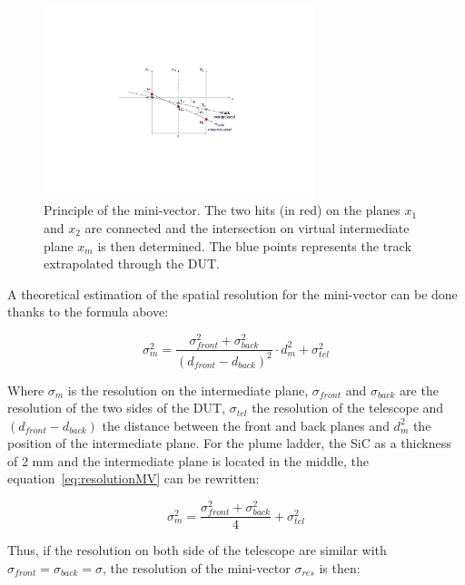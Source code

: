     \begin{figure}[!h]
      \centering
      \includegraphics[width=0.7\textwidth]{Pictures/deformation/mini_vectors.pdf}
      \caption{Principle of the mini-vector. The two hits (in red) on the planes $x_1$ and $x_2$ are connected and the intersection on virtual intermediate plane $x_m$ is then determined. The blue points represents the track extrapolated through the DUT. }
      \label{fig:MV}
    \end{figure}

    A theoretical estimation of the spatial resolution for the mini-vector can be done thanks to the formula above:

    \begin{equation}
      \sigma_m^2 = \frac{\sigma_{front}^2 + \sigma_{back}^2}{(d_{front} - d_{back})^2} \cdot d_{m}^2 + \sigma_{tel}^2
      \label{eq:resolutionMV}
    \end{equation}

    Where $\sigma_m$ is the resolution on the intermediate plane, $\sigma_{front}$ and $\sigma_{back}$ are the resolution of the two sides of the \gls{DUT}, $\sigma_{tel}$ the resolution of the telescope and $(d_{front} - d_{back})$ the distance between the front and back planes and $d_{m}^2$ the position of the intermediate plane.
    For the plume ladder, the \gls{SiC} as a thickness of 2 mm and the intermediate plane is located in the middle, the equation~\ref{eq:resolutionMV} can be rewritten:

    \begin{equation}
      \sigma_m^2 = \frac{\sigma_{front}^2 + \sigma_{back}^2}{4} + \sigma_{tel}^2
    \end{equation}

    Thus, if the resolution on both side of the telescope are similar with $\sigma_{front} = \sigma_{back} = \sigma$, the resolution of the mini-vector $\sigma_{res}$ is then:

